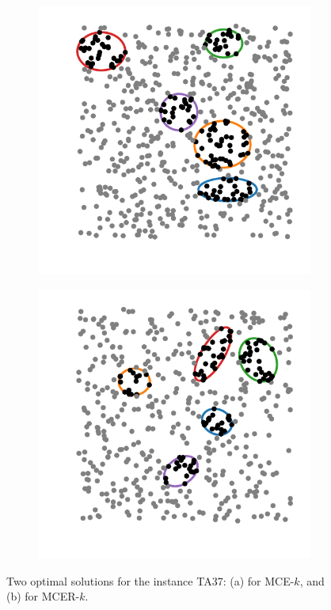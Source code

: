 \begin{figure}
	\begin{subfigure}{.5\textwidth}
		\centering
		\includegraphics[scale=.9]{figures/MCE_TA37}
		\caption{}
		\label{fig:MCE_TA37}
	\end{subfigure}
	\begin{subfigure}{.5\textwidth}
		\centering
		\includegraphics[scale=.9]{figures/MCER_TA37}
		\caption{}
		\label{fig:MCER_TA37}
	\end{subfigure}
	\caption{Two optimal solutions for the instance TA37: (a) for MCE-$k$, and (b) for MCER-$k$.}
	\label{fig:TA37}
\end{figure}


